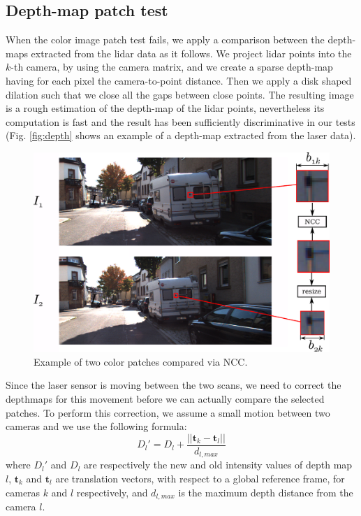 \subsection{Depth-map patch test}%
When the color image patch test fails, we apply a comparison between the depth-maps extracted from the lidar data as it follows.
We project lidar points into the $k$-th camera, by using the camera matrix, and we create a sparse depth-map having for each pixel the camera-to-point distance. Then we apply a disk shaped dilation such that we close all the gaps between close points.
The resulting image is a rough estimation of the depth-map of the lidar points, nevertheless its computation is fast and the result has been sufficiently discriminative in our tests (Fig. \ref{fig:depth} shows an example of a depth-map extracted from the laser data).


\begin{figure}[t]
\centering
\includegraphics[width=0.98\columnwidth]{./img/ch-laser/ncc}
\caption{Example of two color patches compared via NCC.}
\label{fig:ncc}
\end{figure}

Since the laser sensor is moving between the two scans, we need to correct the depthmaps for this movement before we can actually compare the selected patches.
To perform this correction, we assume a small motion between two cameras and we use the following formula:
\begin{equation}
D_l' = D_l + \frac{||\mathbf{t}_k - \mathbf{t}_l||}{d_{l,max}}
\end{equation}
where $D_l'$ and $D_l$ are respectively the new and old intensity values of depth map $l$, $\mathbf{t}_k$ and $\mathbf{t}_l$ are translation vectors, with respect to a global reference frame, for cameras $k$ and $l$ respectively, and $d_{l,max}$ is the maximum depth distance from the camera $l$.

